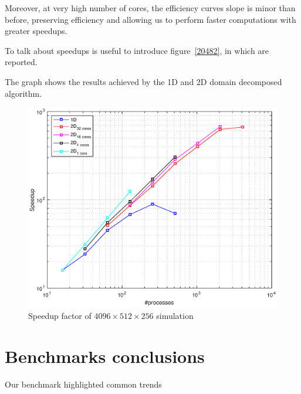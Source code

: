 Moreover, at very high number of cores, the efficiency curves slope is minor than before, preserving efficiency and allowing us to perform faster computations with greater speedups.
\\
\par
To talk about speedups is useful to introduce figure~\ref{20482}, in which are reported.\par
The graph shows the results achieved by the 1D and 2D domain decomposed algorithm.
\begin{figure}
\begin{center}
\includegraphics[scale=0.6]{grafici/20482}
\caption{Speedup factor of $4096\times512 \times256$ simulation}
\label{20483}
\end{center}
\end{figure}



\section{Benchmarks conclusions}
Our benchmark highlighted common trends